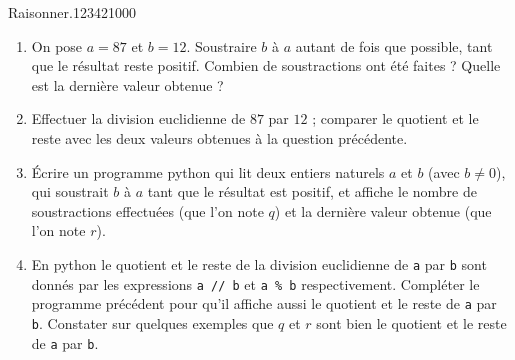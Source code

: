 \begin{pageAlgo}
\begin{ExoCt}{Raisonner.}{1234}{2}{1}{0}{0}{0}
\begin{enumerate}
\item On pose $a=87$ et $b=12$. Soustraire $b$ à $a$ autant de fois
  que possible, tant que le résultat reste positif. Combien
  de soustractions ont été faites ? Quelle est la dernière valeur obtenue ?
\item Effectuer la division euclidienne de $87$ par $12$ ; comparer le quotient
  et le reste avec les deux valeurs obtenues à la question précédente.
\item Écrire un programme python qui lit deux entiers naturels
  $a$ et $b$ (avec $b \neq 0$), qui soustrait $b$ à $a$ tant que
  le résultat est positif, et affiche le nombre de soustractions
  effectuées (que l'on note $q$) et la dernière valeur obtenue (que
  l'on note $r$).
\item En python le quotient et le reste de la division euclidienne
  de {\tt a} par {\tt b} sont donnés par les expressions
  {\tt a // b} et {\tt a \% b} respectivement. Compléter le programme
  précédent pour qu'il affiche aussi le quotient et le reste
  de {\tt a} par {\tt b}. Constater sur quelques exemples que $q$ et $r$
  sont bien le quotient et le reste de {\tt a} par {\tt b}.
\end{enumerate}
\end{ExoCt}





\end{pageAlgo}
